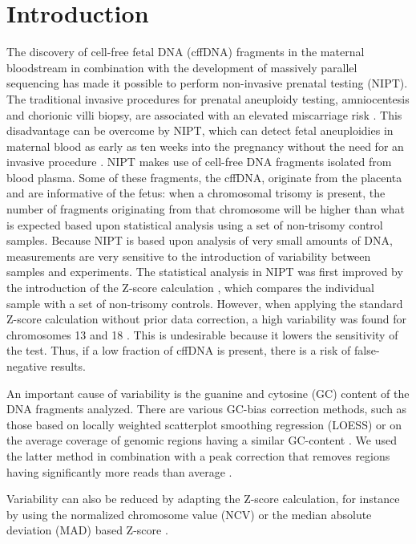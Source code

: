 \section{Introduction}\label{introduction}
The discovery of cell-free fetal DNA (cffDNA) fragments in the maternal bloodstream \cite{Lo_1997} in combination with the development of massively parallel sequencing has made it possible to perform non-invasive prenatal testing (NIPT). 
The traditional invasive procedures for prenatal aneuploidy testing, amniocentesis and chorionic villi biopsy, are associated with an elevated miscarriage risk \cite{Alfirevic_2003}. 
This disadvantage can be overcome by NIPT, which can detect fetal aneuploidies in maternal blood as early as ten weeks into the pregnancy without the need for an invasive procedure \cite{Fan_2008}. 
NIPT makes use of cell-free DNA fragments isolated from blood plasma. Some of these fragments, the cffDNA, originate from the placenta and are informative of the fetus: when a chromosomal trisomy is present, the number of fragments originating from that chromosome will be higher than what is expected based upon statistical analysis using a set of non-trisomy control samples. 
Because NIPT is based upon analysis of very small amounts of DNA, measurements are very sensitive to the introduction of variability between samples and experiments. 
The statistical analysis in NIPT was first improved by the introduction of the Z-score calculation \cite{Chiu_2008}, which compares the individual sample with a set of non-trisomy controls. 
However, when applying the standard Z-score calculation without prior data correction, a high variability was found for chromosomes 13 and 18 \cite{Chen_2011}. 
This is undesirable because it lowers the sensitivity of the test. 
Thus, if a low fraction of cffDNA is present, there is a risk of false-negative results.

An important cause of variability is the guanine and cytosine (GC) content of the DNA fragments analyzed. 
There are various GC-bias correction methods, such as those based on locally weighted scatterplot smoothing regression (LOESS) \cite{Chen_2011,Lau_2012,Palomaki_2012,Liang_2013} or on the average coverage of genomic regions having a similar GC-content \cite{Fan_2010}. 
We used the latter method in combination with a peak correction that removes regions having significantly more reads than average \cite{Fan_2010}.

Variability can also be reduced by adapting the Z-score calculation, for instance by using the normalized chromosome value (NCV) \cite{Lau_2012,Sehnert_2011} or the median absolute deviation (MAD) based Z-score \cite{Stumm_2013}.

